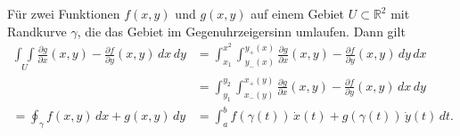 \begin{satz}[Green]
Für zwei Funktionen $f(x,y)$ und $g(x,y)$ auf einem Gebiet
$U\subset\mathbb{R}^2$ mit Randkurve $\gamma$, die das Gebiet
im Gegenuhrzeigersinn umlaufen.
Dann gilt
\begin{align*}
\underset{U}{\int\!\!\!\int}
\frac{\partial g}{\partial x}(x,y)
-
\frac{\partial f}{\partial y}(x,y)
\,dx\,dy
&=
\int_{x_1}^{x^2}
\int_{y_-(x)}^{y_+(x)}
\frac{\partial g}{\partial x}(x,y)
-
\frac{\partial f}{\partial y}(x,y)
\,dy
\,dx
\\
&=
\int_{y_1}^{y_2}
\int_{x_-(y)}^{x_+(y)}
\frac{\partial g}{\partial x}(x,y)
-
\frac{\partial f}{\partial y}(x,y)
\,dx
\,dy
\\
=
\oint_\gamma f(x,y)\,dx + g(x,y)\,dy
&=
\int_a^b f(\gamma(t))\,\dot{x}(t) + g(\gamma(t))\,\dot{y}(t)\,dt.
\end{align*}
\end{satz}

